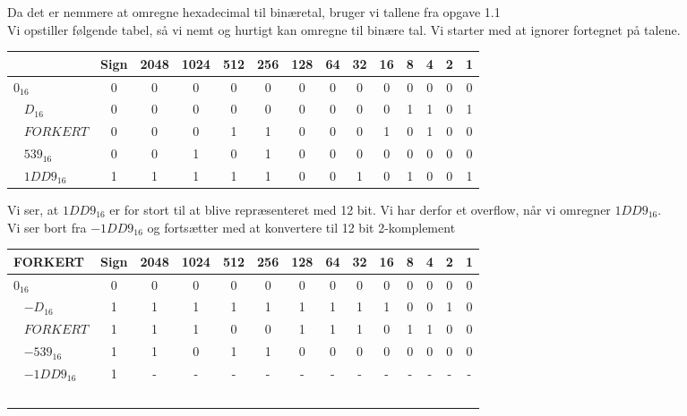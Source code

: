 \documentclass[a4paper,11pt]{article}
\begin{document}
Da det er nemmere at omregne hexadecimal til binæretal, bruger vi tallene fra opgave 1.1\\
Vi opstiller følgende tabel, så vi nemt og hurtigt kan omregne til binære tal. Vi starter med at ignorer fortegnet på talene.
\begin{center}
  \begin{tabular}{ | l | c | c | c |  c |  c |  c |  c |  c |  c |  c |  c |  c |  c | }
    \hline
    & Sign & 2048 & 1024 & 512 & 256 & 128 & 64 & 32 & 16 & 8 & 4 & 2 & 1\\ \hline
    $0_{16}$ &        0 & 0 & 0 & 0 & 0 & 0 & 0 & 0 & 0 & 0 & 0 & 0 & 0 \\ \hline
    $D_{16}$ &      0 & 0 & 0 & 0 & 0 & 0 & 0 & 0 & 0 & 1 & 1 & 0 & 1 \\ \hline
    $FORKERT$ &   0 & 0 & 0 & 1 & 1 & 0 & 0 & 0 & 1 & 0 & 1 & 0 & 0 \\ \hline
    $539_{16}$ &   0 & 0 & 1 & 0 & 1 & 0 & 0 & 0 & 0 & 0 & 0 & 0 & 0 \\ \hline
    $1DD9_{16}$ & 1 & 1 & 1 & 1 & 1 & 0 & 0 & 1 & 0 & 1 & 0 & 0 & 1 \\
    \hline
  \end{tabular}
\end{center}

Vi ser, at  $1DD9_{16}$ er for stort til at blive repræsenteret med 12 bit. Vi har derfor et overflow, når vi omregner  $1DD9_{16}$.\\

Vi ser bort fra $-1DD9_{16}$ og fortsætter med at konvertere til 12 bit 2-komplement
\begin{center}
  \begin{tabular}{ | l | c | c | c |  c |  c |  c |  c |  c |  c |  c |  c |  c |  c | }
   \hline
    FORKERT
    & Sign & 2048 & 1024 & 512 & 256 & 128 & 64 & 32 & 16 & 8 & 4 & 2 & 1\\ \hline
    $0_{16}$ &         0 & 0 & 0 & 0 & 0 & 0 & 0 & 0 & 0 & 0 & 0 & 0 & 0 \\ \hline
    $-D_{16}$ &     1 & 1 & 1 & 1 & 1 & 1 & 1 & 1 & 1 & 0 & 0 & 1 & 0 \\ \hline
    $FORKERT$ &   1 & 1 & 1 & 0 & 0 & 1 & 1 & 1 & 0 & 1 & 1 & 0 & 0 \\ \hline
    $-539_{16}$ &   1 & 1 & 0 & 1 & 1 & 0 & 0 & 0 & 0 & 0 & 0 & 0 & 0 \\ \hline
    $-1DD9_{16}$ & 1 & - & - & - & - & - & - & - & - & - & - & - & - \\ \hline
  \end{tabular}
\end{center}
\end{document}
